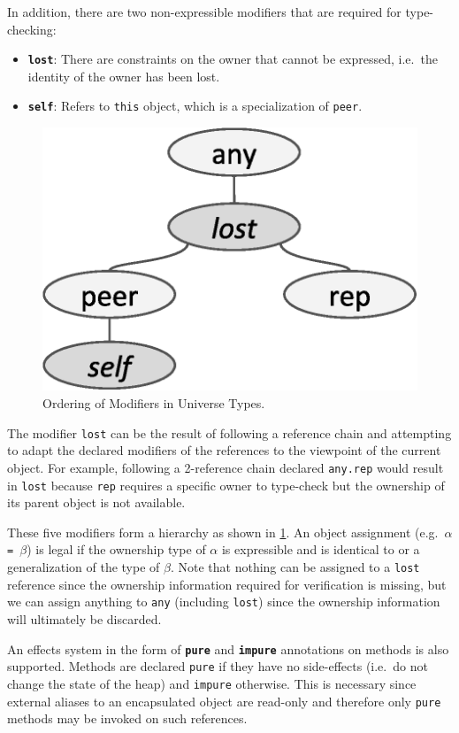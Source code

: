 \documentclass{acm_proc_article-sp}
\begin{document}
In addition, there are two non-expressible modifiers that are required for
type-checking:
\begin{itemize}
	\item \textbf{\lstinline|lost|}:
		There are constraints on the owner that cannot be expressed, i.e.\ the
		identity of the owner has been lost.
	\item \textbf{\lstinline|self|}:
		Refers to \lstinline|this| object, which is a specialization of 
		\lstinline|peer|.
\end{itemize}

\begin{figure}[t]
\centering
\includegraphics[width=0.5\linewidth]{ut-modifiers.eps}
\caption{Ordering of Modifiers in Universe Types.}
\label{fig:ut-modifiers}
\end{figure}

The modifier \lstinline|lost| can be the result of following a reference chain
and attempting to adapt the declared modifiers of the references to the
viewpoint of the current object. For example, following a 2-reference chain
declared \lstinline|any.rep| would result in \lstinline|lost| because
\lstinline|rep| requires a specific owner to type-check but the ownership of
its parent object is not available.
		
These five modifiers form a hierarchy as shown in \cref{fig:ut-modifiers}. An
object assignment (e.g.\ $\alpha$\lstinline| = |$\beta$) is legal if the
ownership type of $\alpha$ is expressible and is identical to or a
generalization of the type of $\beta$. Note that nothing can be assigned to a
\lstinline|lost| reference since the ownership information required for
verification is missing, but we can assign anything to \lstinline|any|
(including \lstinline|lost|) since the ownership information will ultimately be
discarded.

An effects system in the form of \textbf{\lstinline|pure|} and
\textbf{\lstinline|impure|} annotations on methods is also supported. Methods
are declared \lstinline|pure| if they have no side-effects (i.e.\ do not change
the state of the heap) and \lstinline|impure| otherwise. This is necessary
since external aliases to an encapsulated object are read-only and therefore
only \lstinline|pure| methods may be invoked on such references.
\end{document}

